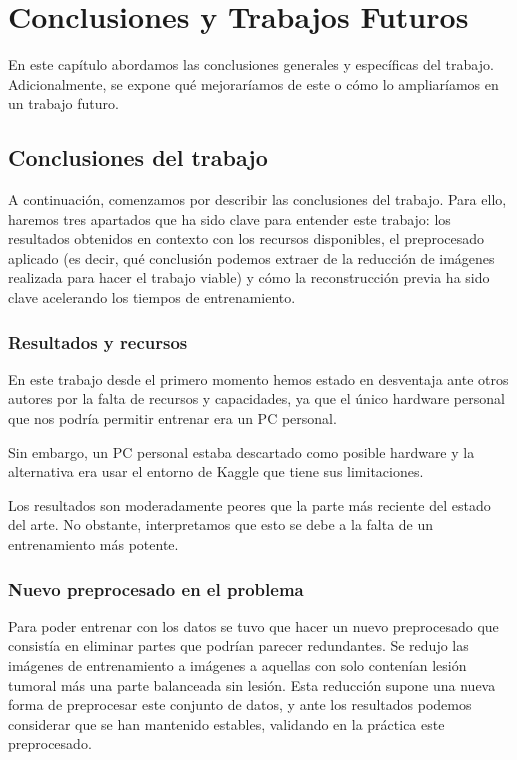 \chapter{Conclusiones y Trabajos Futuros}

En este capítulo abordamos las conclusiones generales y específicas del trabajo. Adicionalmente, se expone qué mejoraríamos de este o cómo lo ampliaríamos en un trabajo futuro.

\section{Conclusiones del trabajo}

A continuación, comenzamos por describir las conclusiones del trabajo. Para ello, haremos tres apartados que ha sido clave para entender este trabajo: los resultados obtenidos en contexto con los recursos disponibles, el preprocesado aplicado (es decir, qué conclusión podemos extraer de la reducción de imágenes realizada para hacer el trabajo viable) y cómo la reconstrucción previa ha sido clave acelerando los tiempos de entrenamiento. 

\subsection{Resultados y recursos}

En este trabajo desde el primero momento hemos estado en desventaja ante otros autores por la falta de recursos y capacidades, ya que el único hardware personal que nos podría permitir entrenar era un PC personal. 

Sin embargo, un PC personal estaba descartado como posible hardware y la alternativa era usar el entorno de Kaggle que tiene sus limitaciones. 

Los resultados son moderadamente peores que la parte más reciente del estado del arte. No obstante, interpretamos que esto se debe a la falta de un entrenamiento más potente.  

\subsection{Nuevo preprocesado en el problema}

Para poder entrenar con los datos se tuvo que hacer un nuevo preprocesado que consistía en eliminar partes que podrían parecer redundantes. Se redujo las imágenes de entrenamiento a imágenes a aquellas con solo contenían lesión tumoral más una parte balanceada sin lesión. Esta reducción supone una nueva forma de preprocesar este conjunto de datos, y ante los resultados podemos considerar que se han mantenido estables, validando en la práctica este preprocesado.

